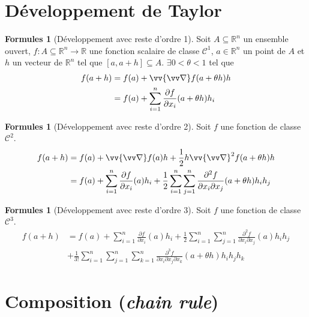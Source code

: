 \documentclass[11pt,a4paper]{article}
\theoremstyle{definition}
\newtheorem{myform}[mydef]{Formules}
\newcommand{\R}{\mathbb{R}}
\let\oldnabla\nabla
\renewcommand{\nabla}{\vv{\oldnabla}}
\newcommand{\fl}{\rightarrow}
\newcommand{\pa}{\partial}
\begin{document}
\section{Développement de Taylor}

\begin{myform}[Développement avec reste d'ordre 1]
Soit $A \subseteq \R^n$ un ensemble ouvert, $f : A \subseteq \R^n \fl \R$ une fonction scalaire de classe $\mathcal{C}^1$, $a \in \R^n$ un point de $A$ et $h$ un vecteur de $\R^n$ tel que $[a, a+h] \subseteq A$. $\exists 0 < \theta < 1$ tel que
 \begin{align*} f(a+h) & = f(a) + \nabla f(a+\theta h)h \\
                        & = f(a) + \sum_{i =1}^n \frac{\pa f}{\pa x_i} (a+\theta h)h_i \end{align*}
\end{myform}

\begin{myform}[Développement avec reste d'ordre 2]
Soit $f$ une fonction de classe $\mathcal{C}^2$.
 \begin{align*} f(a+h) & = f(a) + \nabla f(a) h + \frac 12 h \nabla^2 f(a+\theta h) h \\
                        & = f(a) + \sum_{i=1}^n \frac{\pa f}{\pa x_i}(a)h_i + \frac 12 \sum_{i=1}^n \sum_{j=1}^n \frac{\pa^2 f}{\pa x_i \pa x_j} (a+ \theta h) h_i h_j \end{align*}
\end{myform}

\begin{myform}[Développement avec reste d'ordre 3]
Soit $f$ une fonction de classe $\mathcal{C}^3$.
 \begin{align*} f(a+h) & = f(a) + \sum_{i=1}^n \frac{\pa f}{\pa x_i}(a)h_i + \frac 12 \sum_{i=1}^n \sum_{j=1}^n \frac{\pa^2 f}{\pa x_i \pa x_j} (a) h_i h_j \\ & + \frac{1}{3!} \sum_{i=1}^n \sum_{j=1}^n \sum_{k=1}^n \frac{\pa^3 f}{\pa x_i \pa x_j \pa x_k}(a+\theta h)h_i h_j h_k \end{align*}
\end{myform}


\section{Composition (\emph{chain rule})}
\end{document}
